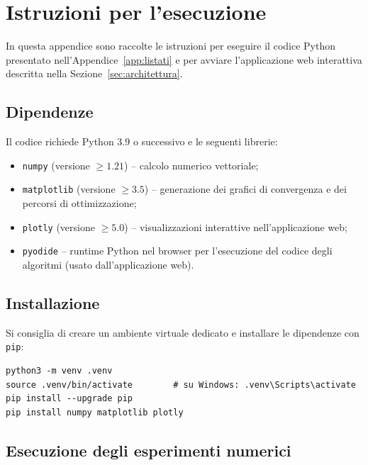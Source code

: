 \documentclass[a4paper,12pt]{article}
\numberwithin{equation}{section}
\numberwithin{figure}{section}
\numberwithin{table}{section}
\begin{document}
\section{Istruzioni per l'esecuzione}\label{app:istruzioni}

In questa appendice sono raccolte le istruzioni per eseguire il codice
Python presentato nell'Appendice~\ref{app:listati} e per avviare
l'applicazione web interattiva descritta nella Sezione~\ref{sec:architettura}.

\subsection{Dipendenze}

Il codice richiede Python 3.9 o successivo e le seguenti librerie:

\begin{itemize}
  \item \texttt{numpy} (versione $\geq 1.21$) -- calcolo numerico vettoriale;
  \item \texttt{matplotlib} (versione $\geq 3.5$) -- generazione dei grafici
  di convergenza e dei percorsi di ottimizzazione;
  \item \texttt{plotly} (versione $\geq 5.0$) -- visualizzazioni interattive
  nell'applicazione web;
  \item \texttt{pyodide} -- runtime Python nel browser per l'esecuzione del
  codice degli algoritmi (usato dall'applicazione web).
\end{itemize}

\subsection{Installazione}

Si consiglia di creare un ambiente virtuale dedicato e installare le
dipendenze con \texttt{pip}:

\begin{verbatim}
python3 -m venv .venv
source .venv/bin/activate        # su Windows: .venv\Scripts\activate
pip install --upgrade pip
pip install numpy matplotlib plotly
\end{verbatim}

\subsection{Esecuzione degli esperimenti numerici}
\end{document}
